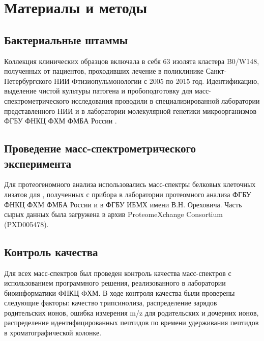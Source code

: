 \section{Материалы и методы}

\subsection{Бактериальные штаммы}
Коллекция клинических образцов включала в себя 63 изолята  кластера B0/W148, полученных от пациентов, проходивших лечение в поликлинике Санкт-Петербургского НИИ Фтизиопульмонологии с 2005 по 2015 год. Идентификацию, выделение чистой культуры патогена и пробоподготовку для масс-спектрометрического исследования проводили в специализированной лаборатории представленного НИИ и в лаборатории молекулярной генетики микроорганизмов ФГБУ ФНКЦ ФХМ ФМБА России \cite{bespyatykh2016proteome}. 

\subsection{Проведение масс-спектрометрического эксперимента}
Для протеогеномного анализа использовались масс-спектры белковых клеточных лизатов для , полученных с прибора  в лаборатории протеомного анализа ФГБУ ФНКЦ ФХМ ФМБА России и  в ФГБУ ИБМХ имени В.Н. Ореховича. Часть сырых данных была загружена в архив ProteomeXchange Consortium \cite{vizcaino2014proteomexchange} (PXD005478).

\subsection{Контроль качества}
Для всех масс-спектров был проведен контроль качества масс-спектров с использованием программного решения, реализованного в лаборатории биоинформатики ФНКЦ ФХМ. В ходе контроля качества были проверены следующие факторы: качество трипсинолиза, распределение зарядов родительских ионов, ошибка измерения m/z для родительских и дочерних ионов, распределение идентифицированных пептидов по времени удерживания пептидов в хроматографической колонке.

